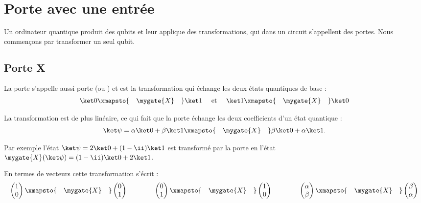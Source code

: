 \documentclass[11pt,class=report,crop=false]{standalone}
\begin{document}
\section{Porte avec une entrée}

Un ordinateur quantique produit des qubits et leur applique des transformations, qui dans un circuit s'appellent des \og{}portes\fg{}. Nous commençons par transformer un seul qubit. 

\subsection{Porte X}

La porte  s'appelle aussi porte  (ou ) et est la transformation qui échange les deux états quantiques de base :
$$\ket 0 \xmapsto{\quad\mygate{X}\quad} \ket 1 \quad \text{ et } \quad \ket 1 \xmapsto{\quad\mygate{X}\quad} \ket 0$$




La transformation est de plus linéaire, ce qui fait que la porte  échange les deux coefficients d'un état quantique :
$$\ket\psi = \alpha  \ket 0 + \beta \ket 1 \xmapsto{\quad\mygate{X}\quad} \beta  \ket 0 + \alpha \ket 1.$$

Par exemple l'état $\ket \psi = 2\ket0 + (1-\ii)\ket1$
est transformé par la porte  en l'état $\mygate{X}(\ket \psi) 
= (1-\ii)\ket0 + 2\ket1$.


En termes de vecteurs cette transformation s'écrit :
$$\begin{pmatrix}1\\0\end{pmatrix} \xmapsto{\quad\mygate{X}\quad} \begin{pmatrix}0\\1\end{pmatrix}
\qquad\qquad  \begin{pmatrix}0\\1\end{pmatrix} \xmapsto{\quad\mygate{X}\quad} \begin{pmatrix}1\\0\end{pmatrix}
\qquad\qquad  \begin{pmatrix}\alpha\\\beta\end{pmatrix} \xmapsto{\quad\mygate{X}\quad} \begin{pmatrix}\beta\\\alpha\end{pmatrix}
$$
\end{document}
